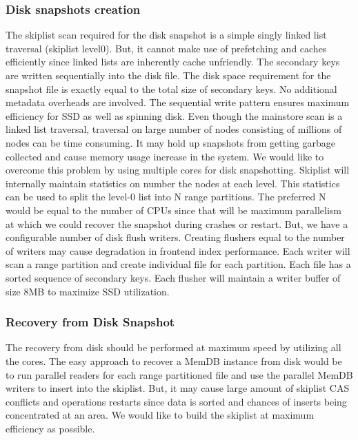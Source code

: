 \documentclass{vldb}
\begin{document}
\subsubsection{Disk snapshots creation}
    The skiplist scan required for the disk snapshot is a simple singly linked list traversal (skiplist level0). But, it cannot make use of prefetching and caches efficiently since linked lists are inherently cache unfriendly. The secondary keys are written sequentially into the disk file. The disk space requirement for the snapshot file is exactly equal to the total size of secondary keys. No additional metadata overheads are involved. The sequential write pattern ensures maximum efficiency for SSD as well as spinning disk. Even though the mainstore scan is a linked list traversal, traversal on large number of nodes consisting of millions of nodes can be time consuming. It may hold up snapshots from getting garbage collected and cause memory usage increase in the system. We would like to overcome this problem by using multiple cores for disk snapshotting.
    Skiplist will internally maintain statistics on number the nodes at each level. This statistics can be used to split the level-0 list into N range partitions. The preferred N would be equal to the number of CPUs since that will be maximum parallelism at which we could recover the snapshot during crashes or restart. But, we have a configurable number of disk flush writers. Creating flushers equal to the number of writers may cause degradation in frontend index performance. Each writer will scan a range partition and create individual file for each partition. Each file has a sorted sequence of secondary keys. Each flusher will maintain a writer buffer of size 8MB to maximize SSD utilization.
    
\subsubsection{Recovery from Disk Snapshot}
The recovery from disk should be performed at maximum speed by utilizing all the cores. The easy approach to recover a MemDB instance from disk would be to run parallel readers for each range partitioned file and use the parallel MemDB writers to insert into the skiplist. But, it may cause large amount of skiplist CAS conflicts and operations restarts since data is sorted and chances of inserts being concentrated at an area. We would like to build the skiplist at maximum efficiency as possible.
\end{document}
